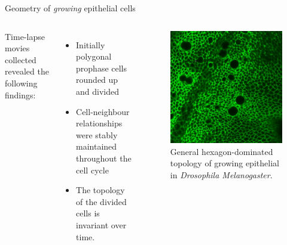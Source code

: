 \documentclass[aspectratio=169, 10pt]{beamer}
\begin{document}
\begin{frame}[fragile]{Geometry of \emph{growing} epithelial cells}    
    
  \begin{columns}[onlytextwidth]
      Time-lapse movies collected revealed the following findings:
        \begin{itemize}
          \item Initially polygonal prophase cells rounded up and divided
          \item Cell-neighbour relationships were stably maintained throughout the cell cycle
          \item The topology of the divided cells is invariant over time.
        \end{itemize}
     
       
          \begin{figure}
              \centering
              \includegraphics[width=.7\textwidth]{figures/supfig1.png}
              \caption{General hexagon-dominated topology of growing epithelial in \emph{Drosophila Melanogaster}.}
              \label{}
          \end{figure}
  \end{columns}
\end{frame}
\end{document}
